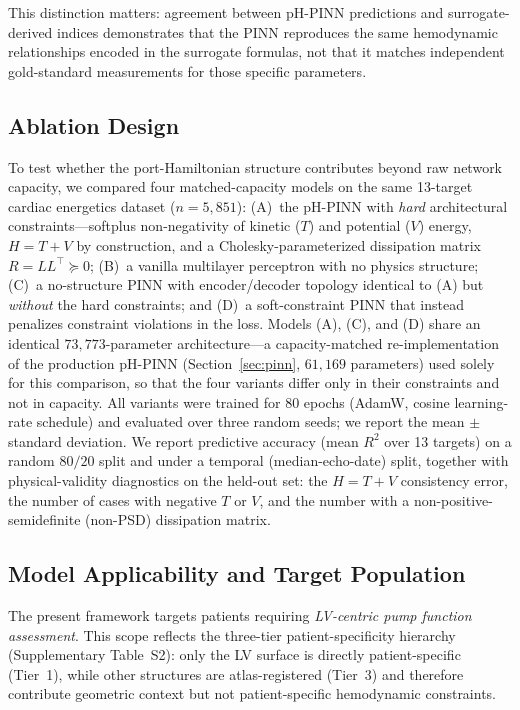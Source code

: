 \documentclass[journal]{IEEEtran}
\begin{document}
This distinction matters: agreement between pH-PINN predictions and surrogate-derived indices demonstrates that the PINN reproduces the same hemodynamic relationships encoded in the surrogate formulas, not that it matches independent gold-standard measurements for those specific parameters.

\subsection{Ablation Design}\label{sec:ablation}
To test whether the port-Hamiltonian structure contributes beyond raw network capacity, we compared four matched-capacity models on the same 13-target cardiac energetics dataset ($n=5{,}851$): (A)~the pH-PINN with \emph{hard} architectural constraints---softplus non-negativity of kinetic ($T$) and potential ($V$) energy, $H=T+V$ by construction, and a Cholesky-parameterized dissipation matrix $R=LL^{\top}\succeq0$; (B)~a vanilla multilayer perceptron with no physics structure; (C)~a no-structure PINN with encoder/decoder topology identical to (A) but \emph{without} the hard constraints; and (D)~a soft-constraint PINN that instead penalizes constraint violations in the loss. Models (A), (C), and (D) share an identical $73{,}773$-parameter architecture---a capacity-matched re-implementation of the production pH-PINN (Section~\ref{sec:pinn}, $61{,}169$ parameters) used solely for this comparison, so that the four variants differ only in their constraints and not in capacity. All variants were trained for 80 epochs (AdamW, cosine learning-rate schedule) and evaluated over three random seeds; we report the mean $\pm$ standard deviation. We report predictive accuracy (mean $R^2$ over 13 targets) on a random $80/20$ split and under a temporal (median-echo-date) split, together with physical-validity diagnostics on the held-out set: the $H=T+V$ consistency error, the number of cases with negative $T$ or $V$, and the number with a non-positive-semidefinite (non-PSD) dissipation matrix.

\subsection{Model Applicability and Target Population}\label{sec:pop}
The present framework targets patients requiring \emph{LV-centric pump function assessment}. This scope reflects the three-tier patient-specificity hierarchy (Supplementary Table~S2): only the LV surface is directly patient-specific (Tier~1), while other structures are atlas-registered (Tier~3) and therefore contribute geometric context but not patient-specific hemodynamic constraints.
\end{document}
